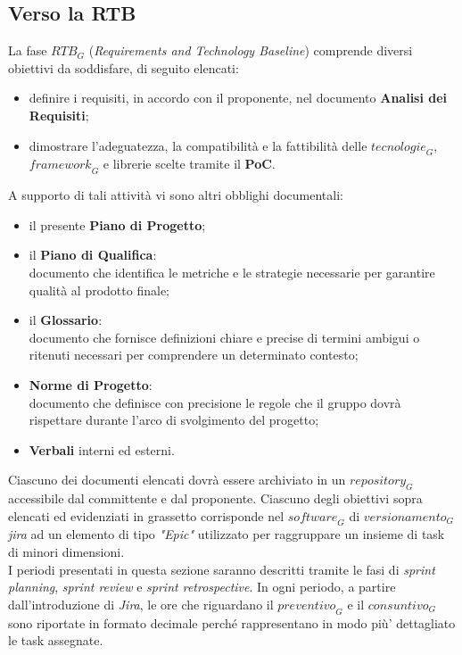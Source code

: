 \subsection{Verso la RTB}
La fase $\textit{RTB}_G$ (\emph{Requirements and Technology Baseline}) comprende diversi obiettivi da soddisfare, di seguito elencati:
\begin{itemize}
    \item definire i requisiti, in accordo con il proponente, nel documento \textbf{Analisi dei Requisiti};
    \item dimostrare l'adeguatezza, la compatibilità e la fattibilità delle $\textit{tecnologie}_G$, $\textit{framework}_G$ e librerie scelte tramite il \textbf{PoC}.
\end{itemize}
A supporto di tali attività vi sono altri obblighi documentali:
\begin{itemize}
    \item il presente \textbf{Piano di Progetto};
    \item il \textbf{Piano di Qualifica}:\\
    documento che identifica le metriche e le strategie necessarie per garantire qualità al prodotto finale;
    \item il \textbf{Glossario}:\\
    documento che fornisce definizioni chiare e precise di termini ambigui o ritenuti necessari per comprendere un determinato contesto;
    \item \textbf{Norme di Progetto}:\\
    documento che definisce con precisione le regole che il gruppo dovrà rispettare durante l'arco di svolgimento del progetto;
    \item \textbf{Verbali} interni ed esterni.
\end{itemize}
Ciascuno dei documenti elencati dovrà essere archiviato in un  $\textit{repository}_G$ accessibile dal committente e dal proponente. Ciascuno degli obiettivi sopra elencati ed evidenziati in grassetto corrisponde nel $\textit{software}_G$ di $\textit{versionamento}_G$ \emph{jira} ad un elemento di tipo \emph{"Epic"} utilizzato per raggruppare un insieme di task di minori dimensioni.\\
I periodi presentati in questa sezione saranno descritti tramite le fasi di \emph{sprint planning}, \emph{sprint review} e \emph{sprint retrospective}. In ogni periodo, a partire dall'introduzione di \emph{Jira}, le ore che riguardano il $\textit{preventivo}_G$ e il $\textit{consuntivo}_G$ sono riportate in formato decimale perché rappresentano in modo più' dettagliato le task assegnate.

\newpage

\newpage

\newpage

\newpage

\newpage

\newpage

\newpage

\newpage

\newpage
